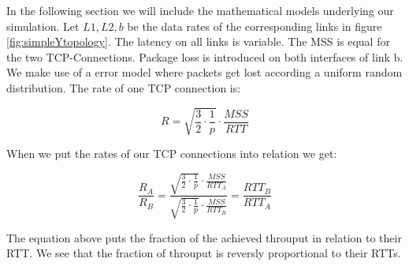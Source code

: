 In the following section we will include the mathematical models underlying our simulation. Let $L1, L2, b$ be the data rates of the corresponding links in figure \ref{fig:simpleYtopology}. The latency on all links is variable. The MSS is equal for the two TCP-Connections. Package loss is introduced on both interfaces of link b. We make use of a error model where packets get lost according a uniform random distribution. The rate of one TCP connection is:

$$R = \sqrt{\frac{3}{2} \cdot \frac{1}{p}} \cdot \frac{MSS}{RTT}$$

When we put the rates of our TCP connections into relation we get:

$$\frac{R_A}{R_B} = \frac{\sqrt{\frac{3}{2} \cdot \frac{1}{p}} \cdot \frac{MSS}{RTT_A}}{\sqrt{\frac{3}{2} \cdot \frac{1}{p}} \cdot \frac{MSS}{RTT_B}} = \frac{RTT_B}{RTT_A} $$

The equation above puts the fraction of the achieved throuput in relation to their RTT. We see that the fraction of throuput is reversly proportional to their RTTs.